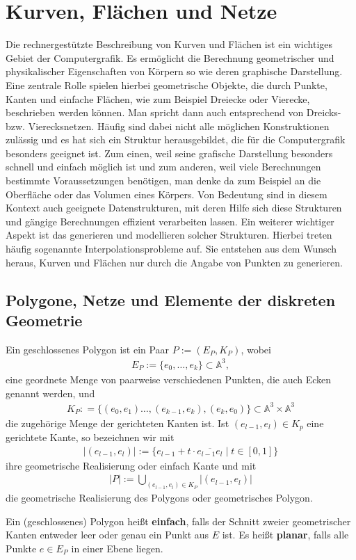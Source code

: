 \section{Kurven, Flächen und  Netze}
Die rechnergestützte Beschreibung von Kurven und Flächen ist ein wichtiges Gebiet der Computergrafik.
Es ermöglicht die Berechnung geometrischer und physikalischer  Eigenschaften von Körpern so wie deren graphische Darstellung.
Eine zentrale Rolle spielen hierbei geometrische Objekte, die durch Punkte, Kanten und einfache Flächen, wie zum Beispiel Dreiecke oder Vierecke, beschrieben werden können. Man spricht dann auch entsprechend von Dreicks- bzw. Vierecksnetzen. Häufig sind dabei nicht alle möglichen Konstruktionen zulässig und es hat sich ein Struktur herausgebildet, die für die Computergrafik besonders geeignet ist. Zum einen, weil seine grafische Darstellung besonders schnell und einfach möglich ist und zum anderen, weil viele Berechnungen bestimmte Voraussetzungen benötigen, man denke da zum Beispiel an die Oberfläche oder das Volumen eines Körpers.
Von Bedeutung sind in diesem Kontext auch geeignete Datenstrukturen, mit deren Hilfe sich diese Strukturen und gängige Berechnungen effizient verarbeiten lassen. 
Ein weiterer wichtiger Aspekt ist das generieren und modellieren solcher Strukturen. Hierbei treten häufig sogenannte Interpolationsprobleme auf. Sie entstehen aus dem Wunsch heraus, Kurven und Flächen nur durch die Angabe von Punkten zu generieren. 

\subsection{Polygone, Netze und Elemente der diskreten Geometrie}
\begin{Definition}
Ein geschlossenes Polygon ist ein Paar $P:=(E_P,K_P)$, wobei   
\begin{align*}
E_P := \{e_0, \hdots, e_k \} \subset \mathbb{A}^3,
\end{align*}
eine geordnete Menge von paarweise verschiedenen Punkten, die auch Ecken genannt werden, und   
\begin{align*}
K_P: = \biggl \{(e_0,e_1)  \hdots, (e_{k-1},e_k), (e_k,e_0) \biggr\} \subset \mathbb{A}^3 \times \mathbb{A}^3
\end{align*}
die zugehörige Menge der gerichteten Kanten ist. 
Ist $(e_{l-1},e_l) \in K_p$ eine gerichtete Kante, so bezeichnen wir mit 
\begin{align*}
|(e_{l-1},e_l)| := \bigl \{ e_{l-1} + t \cdot \overline{e_{l-1}e_{l}} \; \big  | \; t \in [0,1] \bigr \} 
\end{align*}
ihre geometrische Realisierung oder einfach Kante und mit 
\begin{align*}
|P|:= \bigcup_{(e_{l-1},e_l) \in K_P} |(e_{l-1},e_l)|
\end{align*}
 die geometrische Realisierung des Polygons oder geometrisches Polygon.


Ein (geschlossenes) Polygon heißt \textbf{einfach}, falls der Schnitt zweier geometrischer Kanten  entweder leer oder genau ein Punkt aus $E$ ist.
Es heißt \textbf{planar}, falls alle Punkte $e \in E_P$ in einer Ebene liegen.
\end{Definition}


